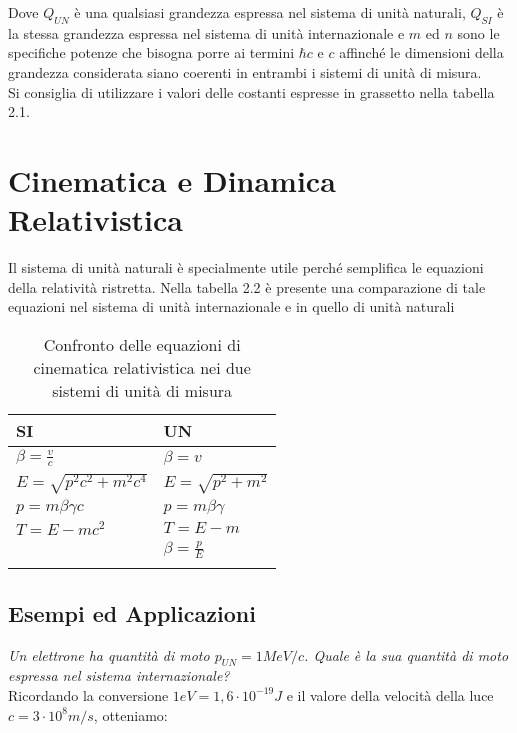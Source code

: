 \documentclass [a4paper, twoside] {book}
\begin{document}
Dove $Q_{UN}$ è una qualsiasi grandezza espressa nel sistema di unità naturali, $Q_{SI}$ è la stessa grandezza espressa nel sistema di unità internazionale e $m$ ed $n$ sono le specifiche potenze che bisogna porre ai termini $\hbar c$ e $c$ affinché le dimensioni della grandezza considerata siano coerenti in entrambi i sistemi di unità di misura.\\
Si consiglia di utilizzare i valori delle costanti espresse in grassetto nella tabella 2.1.\\

\section{Cinematica e Dinamica Relativistica}

Il sistema di unità naturali è specialmente utile perché semplifica le equazioni della relatività ristretta. Nella tabella 2.2 è presente una comparazione di tale equazioni nel sistema di unità internazionale e in quello di unità naturali

\begin{table}[]
\centering
\begin{tabular}{|l|l|}\hline
SI & UN \\ \hline
$\beta=\frac{v}{c}$   & $\beta=v$   \\ \hline
$E=\sqrt{p^2c^2+m^2c^4}$   &   $E=\sqrt{p^2+m^2}$ \\ \hline
$p=m\beta\gamma c$   &  $p=m\beta\gamma$  \\ \hline
$T=E-mc^2$   &  $T=E-m$  \\ \hline 
   &  $\beta=\frac{p}{E}$  \\ \hline
   &  \\ \hline
\end{tabular}
\label{equazioni}
\caption{Confronto delle equazioni di cinematica relativistica nei due sistemi di unità di misura}
\end{table}

\subsection{Esempi ed Applicazioni}

\emph{Un elettrone ha quantità di moto $p_{UN}=1 MeV/c$. Quale è la sua quantità di moto espressa nel sistema internazionale?}\\

Ricordando la conversione $1 eV=1,6\cdot10^{-19} J$ e il valore della velocità della luce $c=3\cdot 10^8 m/s$, otteniamo:
\end{document}
